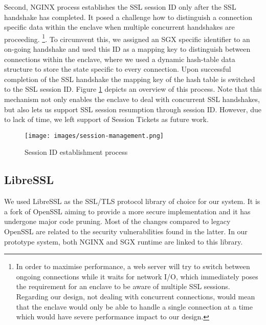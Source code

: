\documentclass[../main.tex]{subfiles}
\begin{document}
Second, NGINX process establishes the SSL session ID only after the SSL
handshake has completed. It posed a challenge how to distinguish a connection
specific data within the enclave when multiple concurrent handshakes are
proceeding. \footnote{In order to maximise performance, a web server will try
to switch between ongoing connections while it waits for network I/O, which
immediately poses the requirement for an enclave to be aware of multiple SSL
sessions. Regarding our design, not dealing with concurrent connections, would
mean that the  enclave would only be able to handle a single connection at
a time which would have severe performance impact to our design.}.
To circumvent this, we assigned an SGX specific identifier to an on-going
handshake and used this ID as a mapping key to distinguish between connections
within the enclave, where we used a dynamic hash-table data structure to store
the state specific to every connection. Upon successful completion of the SSL
handshake the mapping key of the hash table is switched to the SSL session ID.
Figure \ref{fig:session-management} depicts an overview of this process. Note
that this mechanism not only enables the enclave to deal with concurrent SSL
handshakes, but also lets us support SSL session resumption through session ID.
However, due to lack of time, we left support of Session Tickets as future
work. 

\begin{figure}[H]
  \centering
  \texttt{[image: images/session-management.png]}
  \caption{Session ID establishment process}
  \label{fig:session-management}
\end{figure}

\subsection{LibreSSL}
\label{subsec:libressl}
We used LibreSSL as the SSL/TLS protocol library of choice for our system. It
is a fork of OpenSSL aiming to provide a more secure implementation and it has
undergone major code pruning. Most of the changes compared to legacy OpenSSL
are related to the security vulnerabilities found in the latter. In our
prototype system, both NGINX and SGX runtime are linked to this library.
\end{document}
